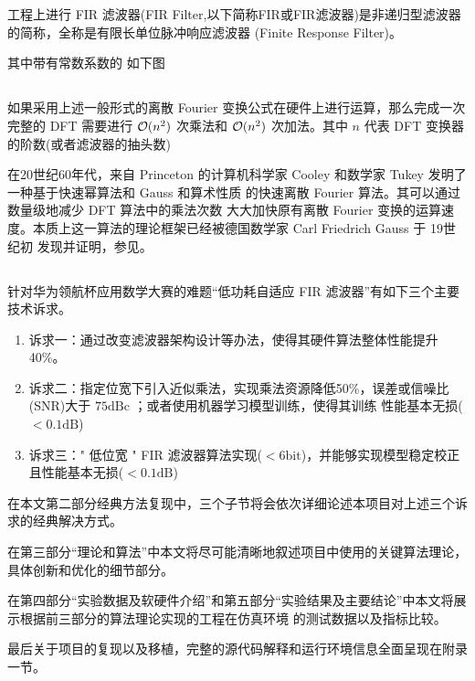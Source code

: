 \section{}

\subsection{}

工程上进行
FIR 滤波器(FIR Filter,以下简称FIR或FIR滤波器)是非递归型滤波器的简称，全称是有限长单位脉冲响应滤波器
(Finite Response Filter)。

其中带有常数系数的
如下图




\subsection{}

如果采用上述一般形式的离散 Fourier 变换公式在硬件上进行运算，那么完成一次完整的 DFT 需要进行
$\mathcal{O} (n^2)$ 次乘法和 $\mathcal{O}(n^2)$ 次加法。其中 $n$ 代表 DFT 变换器的阶数(或者滤波器的抽头数)

在20世纪60年代，来自 Princeton 的计算机科学家 Cooley 和数学家 Tukey 发明了一种基于快速幂算法和 Gauss 和算术性质
的快速离散 Fourier 算法。其可以通过数量级地减少 DFT 算法中的乘法次数
大大加快原有离散 Fourier 变换的运算速度。本质上这一算法的理论框架已经被德国数学家 Carl Friedrich Gauss 于 19世纪初
发现并证明，参见。

\subsection{}


\subsection{}

针对华为领航杯应用数学大赛的难题``低功耗自适应 FIR 滤波器''有如下三个主要技术诉求。

\begin{enumerate}
    \item 诉求一：通过改变滤波器架构设计等办法，使得其硬件算法整体性能提升40\%。
    \item 诉求二：指定位宽下引入近似乘法，实现乘法资源降低50\%，误差或信噪比(SNR)大于 $75 \mathrm{dBc}$
            ；或者使用机器学习模型训练，使得其训练
            性能基本无损($< 0.1 \mathrm{dB}$)
    \item 诉求三：" 低位宽 " FIR 滤波器算法实现($< 6 \mathrm{bit}$)，并能够实现模型稳定校正且性能基本无损($< 0.1 \mathrm{dB}$)
\end{enumerate}

在本文第二部分经典方法复现中，三个子节将会依次详细论述本项目对上述三个诉求的经典解决方式。

在第三部分``理论和算法''中本文将尽可能清晰地叙述项目中使用的关键算法理论，具体创新和优化的细节部分。

在第四部分``实验数据及软硬件介绍''和第五部分``实验结果及主要结论''中本文将展示根据前三部分的算法理论实现的工程在仿真环境
的测试数据以及指标比较。

最后关于项目的复现以及移植，完整的源代码解释和运行环境信息全面呈现在附录一节。

